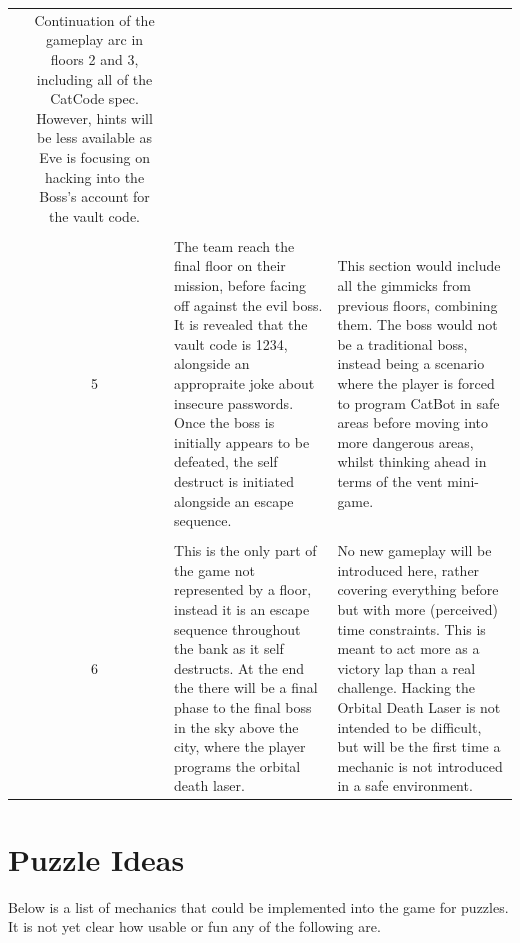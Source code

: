 \begin{fullwidthtable}
\begin{tabular}{ccp{6.8cm}p{7.4cm}}
                & Continuation of the gameplay arc in floors 2 and 3, including all of the CatCode spec. However, hints will be less available as Eve is focusing on hacking into the Boss's account for the vault code.
                \\ \\
            & 5
                & The team reach the final floor on their mission, before facing off against the evil boss. It is revealed that the vault code is 1234, alongside an appropraite joke about insecure passwords. Once the boss is initially appears to be defeated, the self destruct is initiated alongside an escape sequence. 
                & This section would include all the gimmicks from previous floors, combining them. The boss would not be a traditional boss, instead being a scenario where the player is forced to program CatBot in safe areas before moving into more dangerous areas, whilst thinking ahead in terms of the vent mini-game.
                \\ \\
            & 6
                & This is the only part of the game not represented by a floor, instead it is an escape sequence throughout the bank as it self destructs. At the end the there will be a final phase to the final boss in the sky above the city, where the player programs the orbital death laser.
                & No new gameplay will be introduced here, rather covering everything before but with more (perceived) time constraints. This is meant to act more as a victory lap than a real challenge. Hacking the Orbital Death Laser is not intended to be difficult, but will be the first time a mechanic is not introduced in a safe environment.
                
    \\ \bottomrule\end{tabular}
    \caption[Outline of CodeHeist's story and gameplay]{Basic preliminary draft of CodeHeist in terms of plot and gameplay. Note: Story elements would be the first to be cut and were to be treated as asperational.}
    \label{tab:cutContent/tableOfLevels}
\end{fullwidthtable}

\section{Puzzle Ideas}\label{sec:cut/puzzleIdeas}

Below is a list of mechanics that could be implemented into the game for puzzles. It is not yet clear how usable or fun any of the following are.

